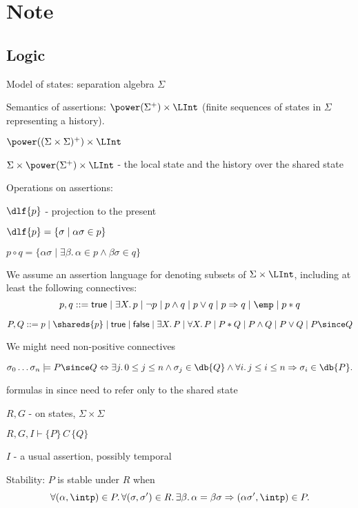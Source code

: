 %

\section{Note}
\subsection{Logic}

Model of states: separation algebra $\Sigma$

Semantics of assertions: $\power(\Sigma^+) \times \LInt$ (finite sequences of states in
$\Sigma$ representing a history).

$\power((\Sigma \times \Sigma)^+) \times \LInt$

$\Sigma \times \power(\Sigma^+) \times \LInt$ - the local state and the history
over the shared state

Operations on assertions:

$\dlf{p}$ - projection to the present

$\dlf{p} = \{\sigma \mid \alpha\sigma \in p\}$

$p \circ q = \{\alpha \sigma \mid \exists \beta.\, \alpha \in p \wedge \beta\sigma \in q\}$

We assume an assertion language for denoting subsets of $\Sigma \times \LInt$, 
including at least the following connectives:
$$
p,q ::= {\sf true} \mid \exists X.\, p \mid \neg p \mid p \wedge q 
\mid  p \vee q \mid p \Rightarrow q  \mid 
\emp \mid p * q
$$

$$
P, Q :: = p \mid \shareds{p} \mid {\sf true} \mid {\sf false} \mid 
\exists X.\, P \mid \forall X.\, P \mid 
P * Q \mid P \wedge Q \mid P \vee Q \mid P \since Q
$$

We might need non-positive connectives

$$
\sigma_0\ldots\sigma_n \models  P \since Q \Leftrightarrow
\exists j.\, 0 \le j \le n \wedge
\sigma_j \in \db{Q} \wedge \forall i.\, j \le i \le n \Rightarrow
\sigma_i \in \db{P}.
$$

formulas in since need to refer only to the shared state

$R, G$ - on states, $\Sigma \times \Sigma$

$R, G, I \vdash \{P\}\,C\,\{Q\}$

$I$ - a usual assertion, possibly temporal

Stability: $P$ is stable under $R$ when
$$
\forall (\alpha, \intp) \in P.\, \forall (\sigma, \sigma') \in R.\,
\exists \beta.\, \alpha = \beta\sigma \Rightarrow (\alpha \sigma', \intp) \in P.
$$

